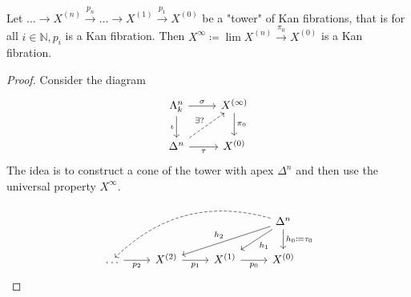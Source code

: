 \begin{prop}
    Let $\dotsc \to X^{(n)} \xrightarrow{p_n} \dotsc \to X^{(1)} \xrightarrow{p_1}X^{(0)}$ be a "tower" of Kan fibrations, that is for all $i \in \mathbb{N}, p_i$ is a Kan fibration.
    Then $X^{\infty} \coloneqq \lim X^{(n)} \xrightarrow{\pi_0} X^{(0)}$ is a Kan fibration. 
\end{prop}

\begin{proof}
    Consider the diagram 
    \[
    \begin{tikzcd}
        \Lambda_k^n
        \arrow[d,"\iota"']
        \ar[r, "\sigma"]
        &
        X^{(\infty)}
        \ar[d,"\pi_0"]
        \\
        \Delta^n
        \ar[ru, dashed, "\exists ?"]
        \ar[r,"\tau"']
        &
        X^{(0)}
    \end{tikzcd}
    \]
    The idea is to construct a cone of the tower with apex $\Delta^n$ and then use the universal property $X^\infty$.
    \[
    \begin{tikzcd}
        &&&
        \Delta^n
        \ar[llld, dashed, bend right]
        \ar[lld, " h_2 "' ]
        \ar[ld , " h_1 " ]
        \ar[d , " h_0 \coloneqq \tau_0" ]
        \\
        \dotsc
        \ar[r, "p_2"']
        &
        X^{(2)}
        \ar[r, "p_1"']
        &
        X^{(1)}
        \ar[r, "p_0"']
        &
        X^{(0)}
    \end{tikzcd}
    \]


\end{proof}
